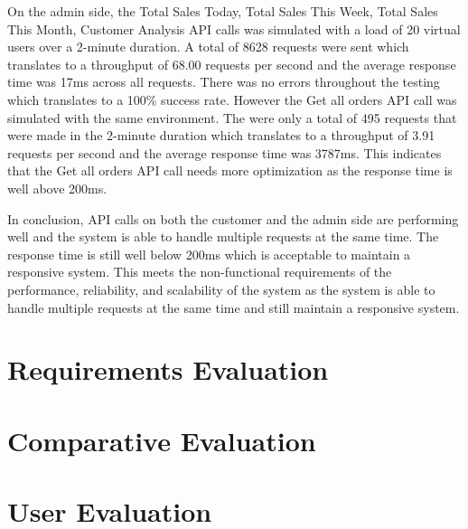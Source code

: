 On the admin side, the Total Sales Today, Total Sales This Week, Total Sales This Month, Customer Analysis API calls was simulated with a load of 20 virtual users over a 2-minute duration. A total of 8628 requests were sent which translates to a throughput of 68.00 requests per second and the average response time was 17ms across all requests. There was no errors throughout the testing which translates to a 100\% success rate. However the Get all orders API call was simulated with the same environment. The were only a total of 495 requests that were made in the 2-minute duration which translates to a throughput of 3.91 requests per second and the average response time was 3787ms. This indicates that the Get all orders API call needs more optimization as the response time is well above 200ms.

In conclusion, API calls on both the customer and the admin side are performing well and the system is able to handle multiple requests at the same time. The response time is still well below 200ms which is acceptable to maintain a responsive system. This meets the non-functional requirements of the performance, reliability, and scalability of the system as the system is able to handle multiple requests at the same time and still maintain a responsive system.

\section{Requirements Evaluation}

\section{Comparative Evaluation}

\section{User Evaluation}
